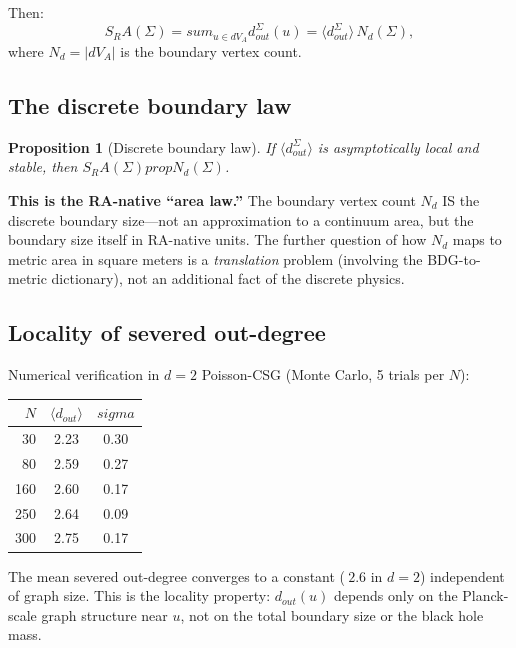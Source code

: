 \documentclass[11pt]{article}
\def\sigma{sigma}%
\def\mathrm#1{#1}%
\def\approx{~}%
\def\sum{sum}%
\def\partial{d}%
\def\propto{prop}%
\def\SRa{S_RA}%
\newtheorem{proposition}{Proposition}
\newcommand{\SRa}{S_{\mathrm{RA}}}
\begin{document}
Then:
\begin{equation}
\label{eq:decomposition}
\SRa(\Sigma)=\sum_{u\in\partial V_A}d_{\mathrm{out}}^\Sigma(u) = \langle d_{\mathrm{out}}^\Sigma\rangle\,N_\partial(\Sigma),
\end{equation}
where $N_\partial=|\partial V_A|$ is the boundary vertex count.

\subsection{The discrete boundary law}

\begin{proposition}[Discrete boundary law]
If $\langle d_{\mathrm{out}}^\Sigma\rangle$ is asymptotically local and stable, then $\SRa(\Sigma)\propto N_\partial(\Sigma)$.
\end{proposition}

\textbf{This is the RA-native ``area law.''} The boundary vertex count $N_\partial$ IS the discrete boundary size---not an approximation to a continuum area, but the boundary size itself in RA-native units. The further question of how $N_\partial$ maps to metric area in square meters is a \emph{translation} problem (involving the BDG-to-metric dictionary), not an additional fact of the discrete physics.

\subsection{Locality of severed out-degree}

Numerical verification in $d=2$ Poisson-CSG (Monte Carlo, 5 trials per $N$):

\begin{center}
\begin{tabular}{rcc}
\toprule
$N$ & $\langle d_{\mathrm{out}}\rangle$ & $\sigma$ \\
\midrule
30 & 2.23 & 0.30 \\
80 & 2.59 & 0.27 \\
160 & 2.60 & 0.17 \\
250 & 2.64 & 0.09 \\
300 & 2.75 & 0.17 \\
\bottomrule
\end{tabular}
\end{center}

The mean severed out-degree converges to a constant ($\approx 2.6$ in $d=2$) independent of graph size. This is the locality property: $d_{\mathrm{out}}(u)$ depends only on the Planck-scale graph structure near $u$, not on the total boundary size or the black hole mass.
\end{document}
